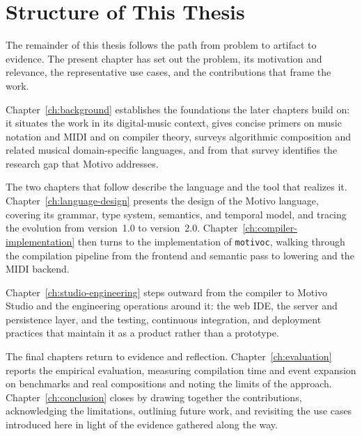 \section{Structure of This Thesis}\label{sec:thesis-structure}

The remainder of this thesis follows the path from problem to artifact to evidence.
The present chapter has set out the problem, its motivation and relevance, the representative use cases, and the
contributions that frame the work.

Chapter~\ref{ch:background} establishes the foundations the later chapters build on: it situates the work in its
digital-music context, gives concise primers on music notation and MIDI and on compiler theory, surveys algorithmic
composition and related musical domain-specific languages, and from that survey identifies the research gap that
Motivo addresses.

The two chapters that follow describe the language and the tool that realizes it.
Chapter~\ref{ch:language-design} presents the design of the Motivo language, covering its grammar, type system,
semantics, and temporal model, and tracing the evolution from version~1.0 to version~2.0.
Chapter~\ref{ch:compiler-implementation} then turns to the implementation of \texttt{motivoc}, walking through the
compilation pipeline from the frontend and semantic pass to lowering and the MIDI backend.

Chapter~\ref{ch:studio-engineering} steps outward from the compiler to Motivo Studio and the engineering operations
around it: the web IDE, the server and persistence layer, and the testing, continuous integration, and deployment
practices that maintain it as a product rather than a prototype.

The final chapters return to evidence and reflection.
Chapter~\ref{ch:evaluation} reports the empirical evaluation, measuring compilation time and event expansion on
benchmarks and real compositions and noting the limits of the approach.
Chapter~\ref{ch:conclusion} closes by drawing together the contributions, acknowledging the limitations, outlining
future work, and revisiting the use cases introduced here in light of the evidence gathered along the way.
